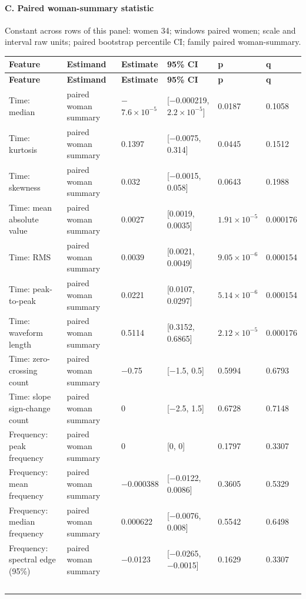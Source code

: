 \documentclass[10pt]{article}
\begin{document}
\begin{landscape}
\paragraph{C. Paired woman-summary statistic}
Constant across rows of this panel: women 34; windows paired women; scale and interval raw units; paired bootstrap percentile CI; family paired woman-summary.
\begin{longtable}{p{4.4cm}p{3.6cm}p{2.0cm}p{3.6cm}p{2.0cm}p{2.0cm}}
\toprule
\textbf{Feature} & \textbf{Estimand} & \textbf{Estimate} & \textbf{95\% CI} & \textbf{p} & \textbf{q} \\
\midrule
\endfirsthead
\toprule
\textbf{Feature} & \textbf{Estimand} & \textbf{Estimate} & \textbf{95\% CI} & \textbf{p} & \textbf{q} \\
\midrule
\endhead
Time: median & paired woman summary & $-$$7.6\times10^{-5}$ & [$-$0.000219, $2.2\times10^{-5}$] & 0.0187 & 0.1058 \\
Time: kurtosis & paired woman summary & 0.1397 & [$-$0.0075, 0.314] & 0.0445 & 0.1512 \\
Time: skewness & paired woman summary & 0.032 & [$-$0.0015, 0.058] & 0.0643 & 0.1988 \\
Time: mean absolute value & paired woman summary & 0.0027 & [0.0019, 0.0035] & $1.91\times10^{-5}$ & 0.000176 \\
Time: RMS & paired woman summary & 0.0039 & [0.0021, 0.0049] & $9.05\times10^{-6}$ & 0.000154 \\
Time: peak-to-peak & paired woman summary & 0.0221 & [0.0107, 0.0297] & $5.14\times10^{-6}$ & 0.000154 \\
Time: waveform length & paired woman summary & 0.5114 & [0.3152, 0.6865] & $2.12\times10^{-5}$ & 0.000176 \\
Time: zero-crossing count & paired woman summary & $-$0.75 & [$-$1.5, 0.5] & 0.5994 & 0.6793 \\
Time: slope sign-change count & paired woman summary & 0 & [$-$2.5, 1.5] & 0.6728 & 0.7148 \\
Frequency: peak frequency & paired woman summary & 0 & [0, 0] & 0.1797 & 0.3307 \\
Frequency: mean frequency & paired woman summary & $-$0.000388 & [$-$0.0122, 0.0086] & 0.3605 & 0.5329 \\
Frequency: median frequency & paired woman summary & 0.000622 & [$-$0.0076, 0.008] & 0.5542 & 0.6498 \\
Frequency: spectral edge (95\%) & paired woman summary & $-$0.0123 & [$-$0.0265, $-$0.0015] & 0.1629 & 0.3307 \\
$$
\end{longtable}
\end{landscape}
\end{document}
